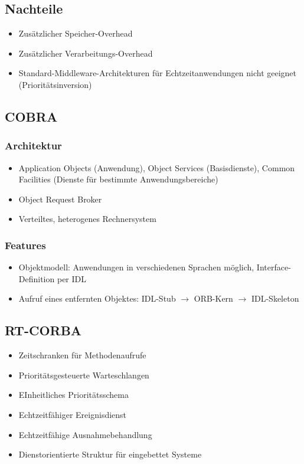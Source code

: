 \subsection{Nachteile}
\begin{itemize}
	\item Zusätzlicher Speicher-Overhead
	\item Zusätzlicher Verarbeitungs-Overhead
	\item Standard-Middleware-Architekturen für Echtzeitanwendungen nicht geeignet (Prioritätsinversion)
\end{itemize}


\subsection{COBRA}

\subsubsection{Architektur}
\begin{itemize}
	\item Application Objects (Anwendung), Object Services (Basisdienste), Common Facilities (Dienste für bestimmte Anwendungsbereiche)
	\item Object Request Broker
	\item Verteiltes, heterogenes Rechnersystem
\end{itemize}

\subsubsection{Features}
\begin{itemize}
	\item Objektmodell: Anwendungen in verschiedenen Sprachen möglich, Interface-Definition per IDL
	\item Aufruf eines entfernten Objektes: IDL-Stub $\rightarrow$ ORB-Kern $\rightarrow$ IDL-Skeleton
\end{itemize}


\subsection{RT-CORBA}
\begin{itemize}
	\item Zeitschranken für Methodenaufrufe
	\item Prioritätsgesteuerte Warteschlangen
	\item EInheitliches Prioritätsschema
	\item Echtzeitfähiger Ereignisdienst
	\item Echtzeitfähige Ausnahmebehandlung
	\item Dienstorientierte Struktur für eingebettet Systeme
\end{itemize}

